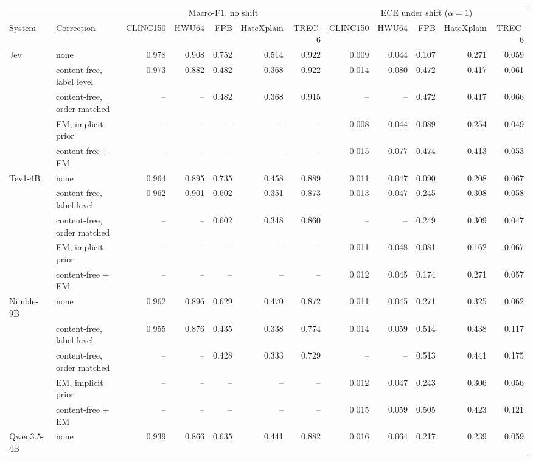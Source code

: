 \begin{tabular}{llrrrrrrrrrr}
\toprule
 & & \multicolumn{5}{c}{Macro-F1, no shift} & \multicolumn{5}{c}{ECE under shift ($\alpha=1$)} \\
System & Correction & CLINC150 & HWU64 & FPB & HateXplain & TREC-6 & CLINC150 & HWU64 & FPB & HateXplain & TREC-6 \\
\midrule
Jev & none & 0.978 & 0.908 & 0.752 & 0.514 & 0.922 & 0.009 & 0.044 & 0.107 & 0.271 & 0.059 \\
 & content-free, label level & 0.973 & 0.882 & 0.482 & 0.368 & 0.922 & 0.014 & 0.080 & 0.472 & 0.417 & 0.061 \\
 & content-free, order matched & -- & -- & 0.482 & 0.368 & 0.915 & -- & -- & 0.472 & 0.417 & 0.066 \\
 & EM, implicit prior & -- & -- & -- & -- & -- & 0.008 & 0.044 & 0.089 & 0.254 & 0.049 \\
 & content-free + EM & -- & -- & -- & -- & -- & 0.015 & 0.077 & 0.474 & 0.413 & 0.053 \\
\midrule
Tev1-4B & none & 0.964 & 0.895 & 0.735 & 0.458 & 0.889 & 0.011 & 0.047 & 0.090 & 0.208 & 0.067 \\
 & content-free, label level & 0.962 & 0.901 & 0.602 & 0.351 & 0.873 & 0.013 & 0.047 & 0.245 & 0.308 & 0.058 \\
 & content-free, order matched & -- & -- & 0.602 & 0.348 & 0.860 & -- & -- & 0.249 & 0.309 & 0.047 \\
 & EM, implicit prior & -- & -- & -- & -- & -- & 0.011 & 0.048 & 0.081 & 0.162 & 0.067 \\
 & content-free + EM & -- & -- & -- & -- & -- & 0.012 & 0.045 & 0.174 & 0.271 & 0.057 \\
\midrule
Nimble-9B & none & 0.962 & 0.896 & 0.629 & 0.470 & 0.872 & 0.011 & 0.045 & 0.271 & 0.325 & 0.062 \\
 & content-free, label level & 0.955 & 0.876 & 0.435 & 0.338 & 0.774 & 0.014 & 0.059 & 0.514 & 0.438 & 0.117 \\
 & content-free, order matched & -- & -- & 0.428 & 0.333 & 0.729 & -- & -- & 0.513 & 0.441 & 0.175 \\
 & EM, implicit prior & -- & -- & -- & -- & -- & 0.012 & 0.047 & 0.243 & 0.306 & 0.056 \\
 & content-free + EM & -- & -- & -- & -- & -- & 0.015 & 0.059 & 0.505 & 0.423 & 0.121 \\
\midrule
Qwen3.5-4B & none & 0.939 & 0.866 & 0.635 & 0.441 & 0.882 & 0.016 & 0.064 & 0.217 & 0.239 & 0.059 \\

\end{tabular}
